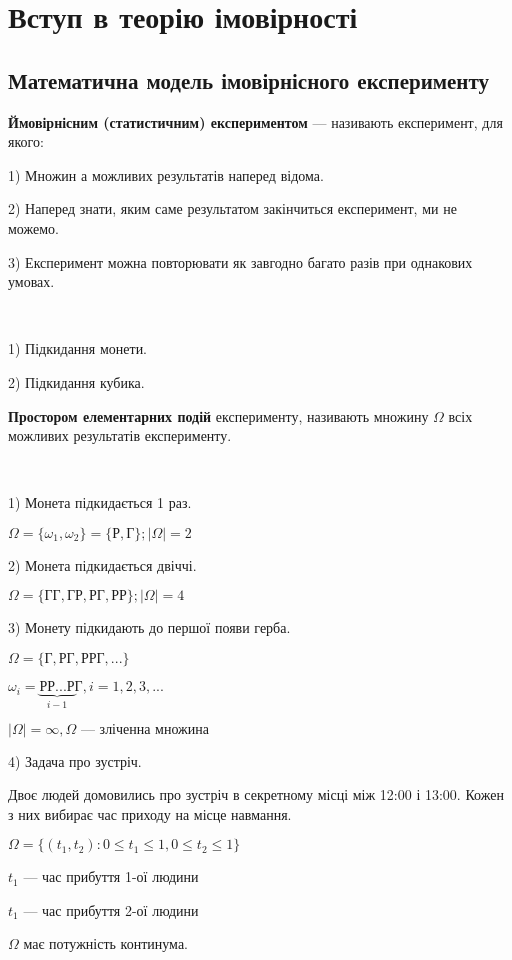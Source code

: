 \chapter{Вступ в теорію імовірності}

\section{Математична модель імовірнісного експерименту}

\begin{definition}
    \textbf{Ймовірнісним (статистичним) експериментом} ---
    називають експеримент, для якого:

    1) Множин а можливих результатів наперед відома.

    2) Наперед знати, яким саме результатом закінчиться
    експеримент, ми не можемо.

    3) Експеримент можна повторювати як завгодно багато
    разів при однакових умовах.
\end{definition}

\begin{example}~\par
    1) Підкидання монети.

    2) Підкидання кубика.
\end{example}

\begin{definition}
    \textbf{Простором елементарних подій} експерименту,
    називають множину $\Omega$ всіх можливих результатів
    експерименту.
\end{definition}

\begin{example}~\par
    1) Монета підкидається 1 раз.

    $\Omega = \{\omega_1, \omega_2\} 
    = \{\text{Р}, \text{Г}\}; |\Omega| = 2$

    2) Монета підкидається двіччі.

    $\Omega = \{\text{ГГ}, \text{ГР}, \text{РГ}, \text{РР}\}; |\Omega| = 4$

    3) Монету підкидають до першої появи герба.

    $\Omega = \{\text{Г}, \text{РГ}, \text{РРГ}, ...\}$
    
    $\omega_i = \underbrace{\text{РР...Р}}\limits_{i-1}\text{Г}, i = 1, 2, 3, ...$
    
    $|\Omega| = \infty, \Omega \text{ --- зліченна множина}$

    4) Задача про зустріч.

    Двоє людей домовились про зустріч в секретному місці
    між 12:00 і 13:00. Кожен з них вибирає час приходу на
    місце навмання.

    $\Omega = \{(t_1, t_2): 0 \leqslant t_1 \leqslant 1,
    0 \leqslant t_2 \leqslant 1\}$

    $t_1$ --- час прибуття 1-ої людини

    $t_1$ --- час прибуття 2-ої людини

    $\Omega$ має потужність континума.
\end{example}

